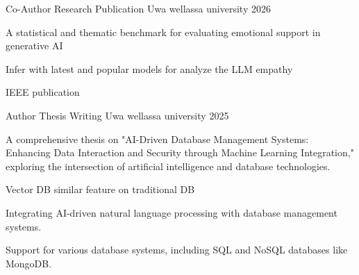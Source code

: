 

\begin{cventries}

  \cventry
    {Co-Author} %
    {Research Publication} %
    {Uwa wellassa university} %
    {2026} %
    {
      \begin{cvitems} %
        \item {A statistical and thematic benchmark for evaluating emotional support in generative AI}
	\item {Infer with latest and popular models for analyze the LLM empathy}
	\item {IEEE publication}
      \end{cvitems}
    }


  \cventry
    {Author} %
    {Thesis Writing} %
    {Uwa wellassa university} %
    {2025} %
    {
      \begin{cvitems} %
        \item {A comprehensive thesis on "AI-Driven Database Management Systems: Enhancing Data Interaction and Security through Machine Learning Integration," exploring the intersection of artificial intelligence and database technologies.}
	\item {Vector DB similar feature on traditional DB}
	\item {Integrating AI-driven natural language processing with database management systems.}
        \item {Support for various database systems, including SQL and NoSQL databases like MongoDB.}
      \end{cvitems}
    }

\end{cventries}
